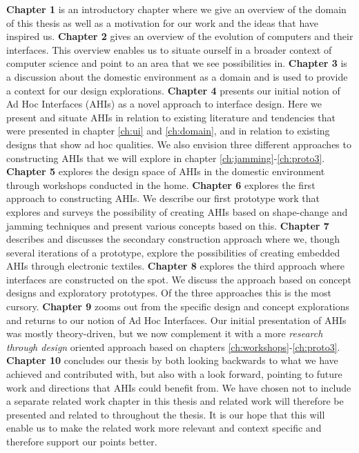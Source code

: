 
\textbf{Chapter 1} is an introductory chapter where we give an overview of the domain of this thesis as well as a motivation for our work and the ideas that have inspired us.
\blank
\textbf{Chapter 2} gives an overview of the evolution of computers and their interfaces.
This overview enables us to situate ourself in a broader context of computer science and point to an area that we see possibilities in.  
\blank
\textbf{Chapter 3} is a discussion about the domestic environment as a domain and is used to provide a context for our design explorations. 
\blank
\textbf{Chapter 4} presents our initial notion of Ad Hoc Interfaces (AHIs) as a novel approach to interface design.
Here we present and situate AHIs in relation to existing literature and tendencies that were presented in chapter \ref{ch:ui} and \ref{ch:domain}, and in relation to existing designs that show ad hoc qualities.
We also envision three different approaches to constructing AHIs that we will explore in chapter \ref{ch:jamming}-\ref{ch:proto3}.
\blank
\textbf{Chapter 5} explores the design space of AHIs in the domestic environment through workshops conducted in the home.
\blank
\textbf{Chapter 6} explores the first approach to constructing AHIs. 
We describe our first prototype work that explores and surveys the possibility of creating AHIs based on shape-change and jamming techniques and present various concepts based on this.
\blank
\textbf{Chapter 7} describes and discusses the secondary construction approach where we, though several iterations of a prototype, explore the possibilities of creating embedded AHIs through electronic textiles.
\blank
\textbf{Chapter 8} explores the third approach where interfaces are constructed on the spot.
We discuss the approach based on concept designs and exploratory prototypes. 
Of the three approaches this is the most cursory.
\blank
\textbf{Chapter 9} zooms out from the specific design and concept explorations and returns to our notion of Ad Hoc Interfaces.
Our initial presentation of AHIs was mostly theory-driven, but we now complement it with a more \emph{research through design} oriented approach based on chapters \ref{ch:workshops}-\ref{ch:proto3}. 
\blank
\textbf{Chapter 10} concludes our thesis by both looking backwards to what we have achieved and contributed with, but also with a look forward, pointing to future work and directions that AHIs could benefit from.
\blank
We have chosen not to include a separate related work chapter in this thesis and related work will therefore be presented and related to throughout the thesis.
It is our hope that this will enable us to make the related work more relevant and context specific and therefore support our points better. 